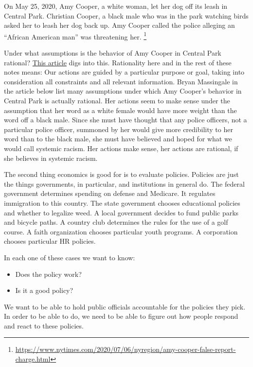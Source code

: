 \documentclass[
]{book}
\providecommand{\tightlist}{%
  \setlength{\itemsep}{0pt}\setlength{\parskip}{0pt}}
\begin{document}
On May 25, 2020, Amy Cooper, a white woman, let her dog off its leash in Central Park. Christian Cooper, a black male who was in the park watching birds asked her to leash her dog back up. Amy Cooper called the police alleging an ``African American man'' was threatening her. \footnote{\url{https://www.nytimes.com/2020/07/06/nyregion/amy-cooper-false-report-charge.html}}

Under what assumptions is the behavior of Amy Cooper in Central Park rational? \href{https://www.ncronline.org/news/opinion/assumptions-white-privilege-and-what-we-can-do-about-it}{This article} digs into this. Rationality here and in the rest of these notes means: Our actions are guided by a particular purpose or goal, taking into consideration all constraints and all relevant information. Bryan Massingale in the article below list many assumptions under which Amy Cooper's behavior in Central Park is actually rational. Her actions seem to make sense under the assumption that her word as a white female would have more weight than the word off a black male. Since she must have thought that any police officers, not a particular police officer, summoned by her would give more credibility to her word than to the black male, she must have believed and hoped for what we would call systemic racism. Her actions make sense, her actions are rational, if she believes in systemic racism.

The second thing economics is good for is to evaluate policies. Policies are just the things governments, in particular, and institutions in general do. The federal government determines spending on defense and Medicare. It regulates immigration to this country. The state government chooses educational policies and whether to legalize weed. A local government decides to fund public parks and bicycle paths. A country club determines the rules for the use of a golf course. A faith organization chooses particular youth programs. A corporation chooses particular HR policies.

In each one of these cases we want to know:

\begin{itemize}
\tightlist
\item
  Does the policy work?
\item
  Is it a good policy?
\end{itemize}

We want to be able to hold public officials accountable for the policies they pick. In order to be able to do, we need to be able to figure out how people respond and react to these policies.
\end{document}
